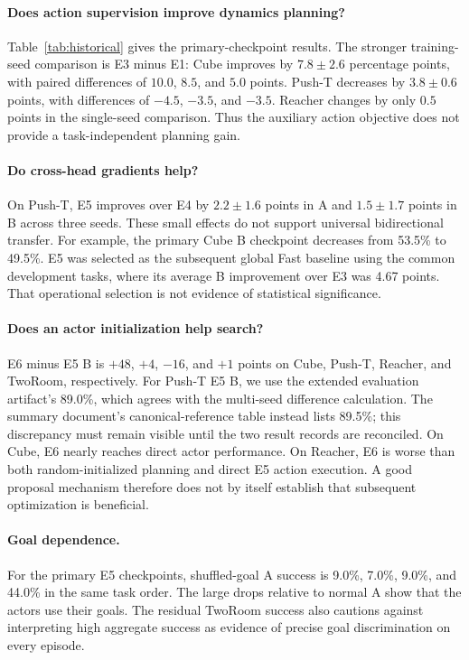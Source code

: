 \paragraph{Does action supervision improve dynamics planning?}
Table~\ref{tab:historical} gives the primary-checkpoint results. The stronger training-seed comparison is E3 minus E1: Cube improves by $7.8\pm2.6$ percentage points, with paired differences of $10.0$, $8.5$, and $5.0$ points. Push-T decreases by $3.8\pm0.6$ points, with differences of $-4.5$, $-3.5$, and $-3.5$. Reacher changes by only $0.5$ points in the single-seed comparison. Thus the auxiliary action objective does not provide a task-independent planning gain.

\paragraph{Do cross-head gradients help?}
On Push-T, E5 improves over E4 by $2.2\pm1.6$ points in A and $1.5\pm1.7$ points in B across three seeds. These small effects do not support universal bidirectional transfer. For example, the primary Cube B checkpoint decreases from 53.5\% to 49.5\%.
E5 was selected as the subsequent global Fast baseline using the common development tasks, where its average B improvement over E3 was 4.67 points. That operational selection is not evidence of statistical significance.

\paragraph{Does an actor initialization help search?}
E6 minus E5 B is $+48$, $+4$, $-16$, and $+1$ points on Cube, Push-T, Reacher, and TwoRoom, respectively. For Push-T E5 B, we use the extended evaluation artifact's 89.0\%, which agrees with the multi-seed difference calculation. The summary document's canonical-reference table instead lists 89.5\%; this discrepancy must remain visible until the two result records are reconciled.
On Cube, E6 nearly reaches direct actor performance. On Reacher, E6 is worse than both random-initialized planning and direct E5 action execution. A good proposal mechanism therefore does not by itself establish that subsequent optimization is beneficial.

\paragraph{Goal dependence.}
For the primary E5 checkpoints, shuffled-goal A success is 9.0\%, 7.0\%, 9.0\%, and 44.0\% in the same task order. The large drops relative to normal A show that the actors use their goals. The residual TwoRoom success also cautions against interpreting high aggregate success as evidence of precise goal discrimination on every episode.

